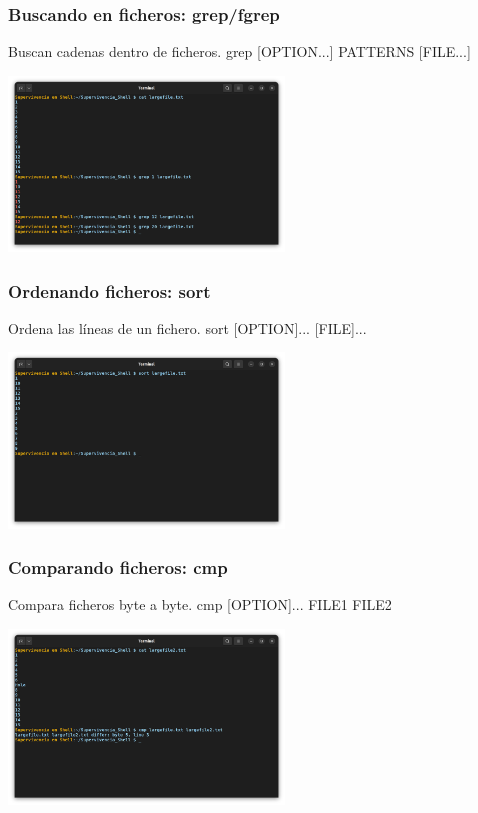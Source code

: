 \documentclass[10pt]{beamer}
\begin{document}
	\begin{frame}
		\frametitle{Buscando en ficheros: grep/fgrep}
		\begin{alertblock}{Buscan cadenas dentro de ficheros.}
			grep [OPTION...] PATTERNS [FILE...]
		\end{alertblock}
		\begin{center}
			\includegraphics[width=0.55\textwidth]{grep}
		\end{center}
	\end{frame}
	
	\begin{frame}
		\frametitle{Ordenando ficheros: sort}
		\begin{alertblock}{Ordena las líneas de un fichero.}
			sort [OPTION]... [FILE]...
		\end{alertblock}
		\begin{center}
			\includegraphics[width=0.55\textwidth]{sort}
		\end{center}
	\end{frame}
		
	\begin{frame}
		\frametitle{Comparando ficheros: cmp}
		\begin{alertblock}{Compara ficheros byte a byte.}
			cmp [OPTION]... FILE1 FILE2
		\end{alertblock}
		\begin{center}
			\includegraphics[width=0.55\textwidth]{cmp}
		\end{center}
	\end{frame}
	
\end{document}
